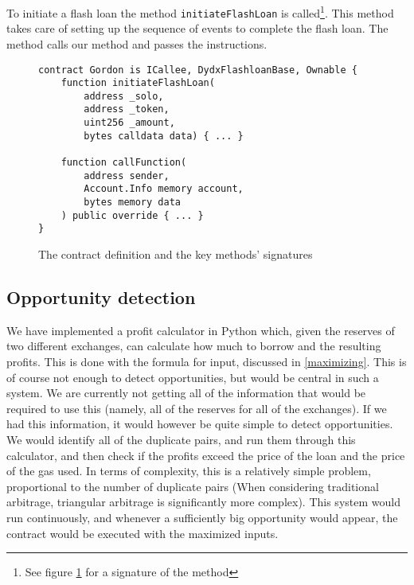 \noindent To initiate a flash loan the method \verb|initiateFlashLoan| is
called\footnote{See figure \ref{signature} for a signature of the method}. This
method takes care of setting up the sequence of events to complete the flash
loan. The method calls our  method and passes the
instructions.

\begin{figure}[H]
\begin{lstlisting}[language=Solidity,numbers=none]
contract Gordon is ICallee, DydxFlashloanBase, Ownable {
    function initiateFlashLoan(
        address _solo,
        address _token,
        uint256 _amount,
        bytes calldata data) { ... }

    function callFunction(
        address sender,
        Account.Info memory account,
        bytes memory data
    ) public override { ... }
}
\end{lstlisting}
    \caption{The contract definition and the key methods' signatures}
    \label{signature}
\end{figure}

\subsection{Opportunity detection}
We have implemented a profit calculator in Python which, given the reserves of
two different exchanges, can calculate how much to borrow and the resulting
profits. This is done with the formula for input, discussed in
\autoref{maximizing}. This is of course not enough to detect opportunities, but
would be central in such a system. We are currently not getting all of the
information that would be required to use this (namely, all of the reserves for
all of the exchanges). If we had this information, it would however be quite
simple to detect opportunities. We would identify all of the duplicate pairs,
and run them through this calculator, and then check if the profits exceed the
price of the loan and the price of the gas used. In terms of complexity, this is
a relatively simple problem, proportional to the number of duplicate pairs (When
considering traditional arbitrage, triangular arbitrage is significantly more
complex). This system would run continuously, and whenever a sufficiently big
opportunity would appear, the contract would be executed with the maximized
inputs.
